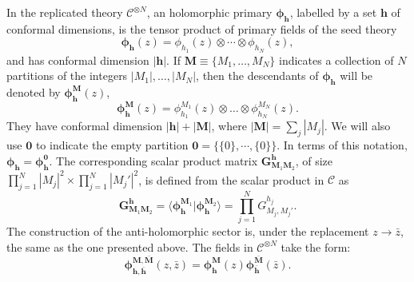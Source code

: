 \documentclass[a4paper,11pt]{article}
\begin{document}
In the replicated theory $\mathcal{C}^{\otimes N}$, an holomorphic primary $\boldsymbol{\phi_{h}}$, labelled by a set $\boldsymbol{h}$ of conformal dimensions, is the tensor product of primary fields of the seed theory
\begin{equation}
\boldsymbol{\phi}_{\boldsymbol{h}}(z)=\phi_{h_1}(z)\otimes \cdots\otimes \phi_{h_N}(z),
\end{equation}
and has conformal dimension $|\boldsymbol{h}|$. If $\boldsymbol{M}\equiv\{M_1,\dots,M_N\}$ indicates a collection of $N$ partitions of the integers $|M_1|,\dots,|M_N|$, then the descendants of $\boldsymbol{\phi}_{\boldsymbol{h}}$ will be denoted by $\boldsymbol{\phi}^{\boldsymbol{M}}_{\boldsymbol{h}}(z)$,
 \begin{equation}
 \label{descor}
 \boldsymbol{\phi}_{\boldsymbol{h}}^{\boldsymbol{M}}(z)=\phi_{h_1}^{M_1}(z)\otimes \dots \otimes \phi_{h_N}^{M_N}(z).
\end{equation}
They have conformal dimension $|\boldsymbol{h}|+|\boldsymbol{M}|$, where $|\boldsymbol{M}|=\sum_j |M_j|$. 
We will also use $\boldsymbol{0}$ to indicate the empty partition $\boldsymbol{0}=\{\{0\},\cdots,\{0\}\}$. In terms of this notation, 
$\boldsymbol{\phi}_{\boldsymbol{h}}=\boldsymbol{\phi}_{\boldsymbol{h}}^{\boldsymbol{0}}$.
The corresponding scalar product matrix $\boldsymbol{G}^{\boldsymbol{h}}_{\boldsymbol{M}_1\boldsymbol{M}_2}$, of size $\prod_{j=1}^{N}|M_j|^2\times \prod_{j=1}^{N}|M_j'|^2$, is defined from the scalar product in $\mathcal{C}$ as
\begin{equation}
\label{scal}
 \boldsymbol{G}^{\boldsymbol{h}}_{\boldsymbol{M}_1\boldsymbol{M}_2}=\langle \boldsymbol{\phi}_{\boldsymbol{h}}^{\boldsymbol{M}_1} | \boldsymbol{\phi}_{\boldsymbol{h}}^{\boldsymbol{M}_2}\rangle=\prod_{j=1}^N G^{h_j}_{M_j,M_j'}.
\end{equation}
The construction of the anti-holomorphic sector is, under the replacement $z\to \bar{z}$, the same as the one presented above.  The  fields in $\mathcal{C}^{\otimes N}$ take the form:
\begin{equation}
\boldsymbol{\phi}^{\boldsymbol{M},\boldsymbol{\bar{M}}}_{\boldsymbol{h},\boldsymbol{\bar{h}}} (z,\bar{z})=\boldsymbol{\phi}^{\boldsymbol{M}}_{\boldsymbol{h}}(z)\boldsymbol{\phi}^{\boldsymbol{\bar{M}}}_{\boldsymbol{\bar{h}}}(\bar{z}).
\end{equation} 
\end{document}
